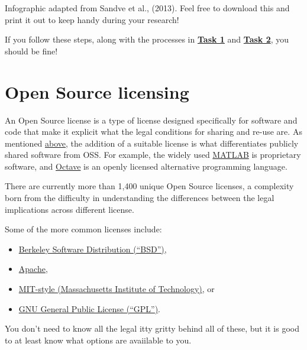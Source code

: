 \documentclass[]{book}
\providecommand{\tightlist}{%
  \setlength{\itemsep}{0pt}\setlength{\parskip}{0pt}}
\begin{document}
Infographic adapted from Sandve et al., (2013). Feel free to download this and print it out to keep handy during your research!

If you follow these steps, along with the processes in \href{https://github.com/OpenScienceMOOC/Module-5-Open-Research-Software-and-Open-Source/blob/master/content_development/Task_1.md}{\textbf{Task 1}} and \href{https://github.com/OpenScienceMOOC/Module-5-Open-Research-Software-and-Open-Source/blob/master/content_development/Task_2.md}{\textbf{Task 2}}, you should be fine!

\hypertarget{open-source-licensing}{%
\section{Open Source licensing }\label{open-source-licensing}}

An Open Source license is a type of license designed specifically for software and code that make it explicit what the legal conditions for sharing and re-use are. As mentioned \protect\hyperlink{What_OSS}{above}, the addition of a suitable license is what differentiates publicly shared software from OSS. For example, the widely used \href{https://www.mathworks.com/products/matlab.html}{MATLAB} is proprietary software, and \href{https://www.gnu.org/software/octave/}{Octave} is an openly licensed alternative programming language.

There are currently more than 1,400 unique Open Source licenses, a complexity born from the difficulty in understanding the differences between the legal implications across different license.

Some of the more common licenses include:

\begin{itemize}
\tightlist
\item
  \href{https://en.wikipedia.org/wiki/BSD_licenses}{Berkeley Software Distribution (``BSD'')},
\item
  \href{https://www.apache.org/licenses/LICENSE-2.0}{Apache},
\item
  \href{https://opensource.org/licenses/MIT}{MIT-style (Massachusetts Institute of Technology)}, or
\item
  \href{https://www.gnu.org/licenses/gpl-3.0.en.html}{GNU General Public License (``GPL'')}.
\end{itemize}

You don't need to know all the legal itty gritty behind all of these, but it is good to at least know what options are avaiilable to you.
\end{document}
